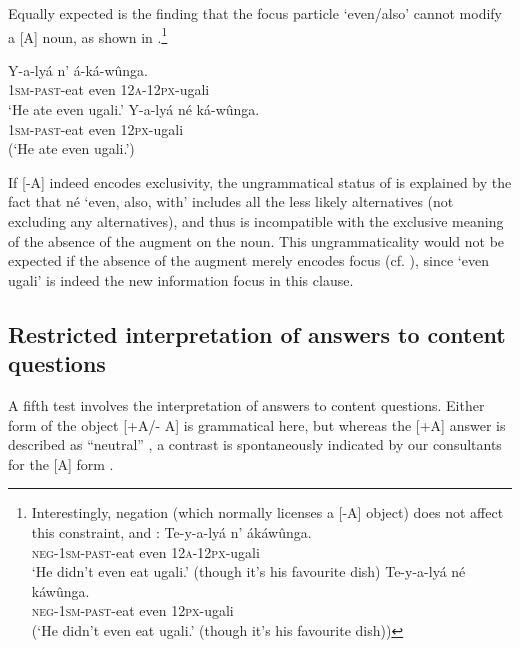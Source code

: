 \documentclass[output=paper]{langsci/langscibook}
\begin{document}
Equally expected is the finding that the focus particle ‘even/also’ cannot modify a [A] noun, as shown in .\footnote{%
  Interestingly, negation (which normally licenses a [-A] object) does not affect this constraint, and :
    \ea 
      \ea 
      \gll Te-y-a-lyá    n’  ákáwûnga.\\
	\textsc{neg}-\textsc{1sm}-\textsc{past}-eat  even  \textsc{12a}-\textsc{12px}-ugali\\
      \glt   ‘He didn’t even eat ugali.’ (though it’s his favourite dish)
      \ex
      \gll *Te-y-a-lyá    né  káwûnga.\\
	\textsc{neg}-\textsc{1sm}-\textsc{past}-eat  even  \textsc{12px}-ugali\\
	(‘He didn’t even eat ugali.’ (though it’s his favourite dish))
      \z
    \z
}

\ea\label{ex:vanderwal:32}
\ea\label{ex:vanderwal:32a}
\gll     Y-a-lyá    n’  á-ká-wûnga.\\
         \textsc{1sm}-\textsc{past}-eat  even  \textsc{12a}-\textsc{12px}-ugali\\
\glt     ‘He ate even ugali.’
\ex\label{ex:vanderwal:32b}
\gll     *Y-a-lyá    né  ká-wûnga.\\
         \textsc{1sm}-\textsc{past}-eat  even  \textsc{12px}-ugali\\
\glt     (‘He ate even ugali.’)
\z
\z

If [-A] indeed encodes exclusivity, the ungrammatical status of  is explained by the fact that né ‘even, also, with’ includes all the less likely alternatives (not excluding any alternatives), and thus is incompatible with the exclusive meaning of the absence of the augment on the noun. This ungrammaticality would not be expected if the absence of the augment merely encodes focus (cf. \citealt{HymanKatamba1993}), since ‘even ugali’ is indeed the new information focus in this clause.

\subsection{Restricted interpretation of answers to content questions}\label{sec:vanderwal:4.5} %

A fifth test involves the interpretation of answers to content questions. Either form of the object [+A/- A] is grammatical here, but whereas the [+A] answer is described as “neutral” , a contrast is spontaneously indicated by our consultants for the [A] form . 
\end{document}
